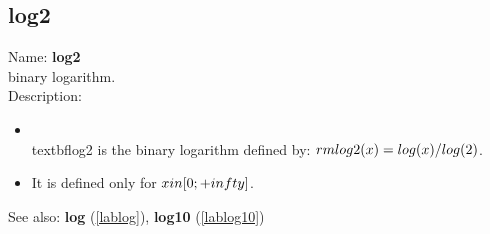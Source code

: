 \subsection{log2}
\label{lablog2}
\noindent Name: \textbf{log2}\\
binary logarithm.\\
\noindent Description: \begin{itemize}

\item \\textbf{log2} is the binary logarithm defined by: ${\\rm log2}(x) = \\log(x)/\\log(2)$.\n
\item It is defined only for $x \\in [0; +\\infty]$.\n\end{itemize}
See also: \textbf{log} (\ref{lablog}), \textbf{log10} (\ref{lablog10})
